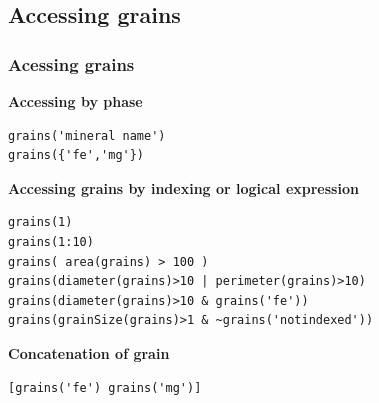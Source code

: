 \subsection{Accessing grains}
\begin{frame}[fragile]
  \frametitle{Acessing grains}

\textbf{Accessing by phase}
\begin{lstlisting}
grains('mineral name')
grains({'fe','mg'})
\end{lstlisting}

\textbf{Accessing grains by indexing or logical expression}
\begin{lstlisting}
grains(1)
grains(1:10)
grains( area(grains) > 100 )
grains(diameter(grains)>10 | perimeter(grains)>10)
grains(diameter(grains)>10 & grains('fe'))
grains(grainSize(grains)>1 & ~grains('notindexed'))
\end{lstlisting}

\textbf{Concatenation of grain}
\begin{lstlisting}
[grains('fe') grains('mg')]
\end{lstlisting}
\end{frame}


